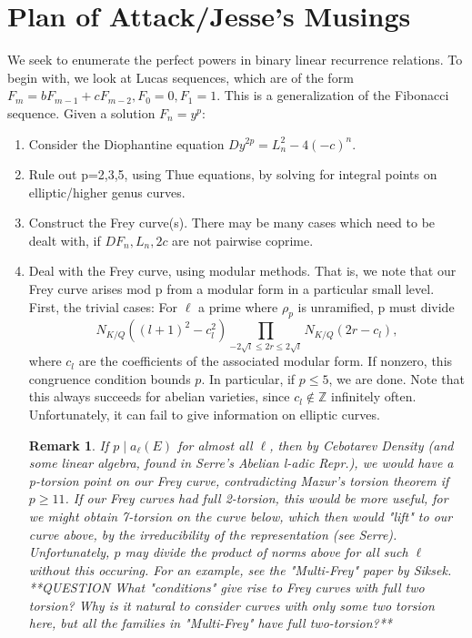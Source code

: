 \documentclass[12pt]{article}
\newtheorem{rem}[thm]{Remark}
\def\Z{{\mathbb Z}}
\begin{document}
\section{Plan of Attack/Jesse's Musings}
We seek to enumerate the perfect powers in binary linear recurrence relations. To begin with, we look at Lucas sequences, which are of the form $F_m = b F_{m-1} + c F_{m-2}, F_0 = 0, F_1 = 1$. This is a generalization of the Fibonacci sequence. Given a solution $F_n=y^p$:
\begin{enumerate}
\item
  Consider the Diophantine equation $Dy^{2p} = L_n^2 - 4(-c)^n$.
\item
  Rule out p=2,3,5, using Thue equations, by solving for integral points on elliptic/higher genus curves.
\item
  Construct the Frey curve(s). There may be many cases which need to be dealt with, if $DF_n, L_n, 2c$ are not pairwise coprime.
\item Deal with the Frey curve, using modular methods. That is, we note that our Frey curve arises mod p from a modular form in a particular small level. First, the trivial cases:
    For $\ell$ a prime where $\rho_p$ is unramified, p must divide 
        \[ N_{K/Q}((l+1)^2 - c_l^2)\prod_{-2\sqrt{l} \leq 2r \leq 2\sqrt{l}} N_{K/Q}(2r - c_l), \]
        where $c_l$ are the coefficients of the associated modular form.
    If nonzero, this congruence condition bounds $p$. In particular, if $p \leq 5$, we are done. Note that this always succeeds for abelian varieties, since $c_l \notin \Z$ infinitely often. Unfortunately, it can fail to give information on elliptic curves.
    \begin{rem}
     If $p \mid a_{\ell}(E)$ for almost all $\ell$, then by Cebotarev Density (and some linear algebra, found in Serre's Abelian l-adic Repr.), we would have a p-torsion point on our Frey curve, contradicting Mazur's torsion theorem if $p \geq 11$. If our Frey curves had full 2-torsion, this would be more useful, for we might obtain 7-torsion on the curve below, which then would "lift" to our curve above, by the irreducibility of the representation (see Serre). Unfortunately, $p$ may divide the product of norms above for all such $\ell$ without this occuring. For an example, see the "Multi-Frey" paper by Siksek. 
     **QUESTION What "conditions" give rise to Frey curves with full two torsion? Why is it natural to consider curves with only some two torsion here, but all the families in "Multi-Frey" have full two-torsion?**
	\end{rem}    


\end{enumerate}
\end{document}
